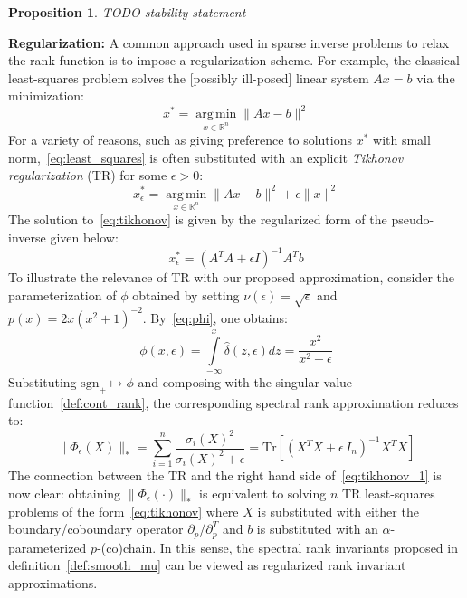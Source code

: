 \documentclass[10pt]{article}
\numberwithin{equation}{section}
\newcommand{\+}{%
	\raisebox{0.18ex}{\scaleobj{0.55}{+}}
}
\DeclareMathOperator*{\argmin}{arg\,min}
\newtheorem{proposition}{Proposition}
\theoremstyle{definition}
\theoremstyle{definition}
\begin{document}
\begin{proposition}
	TODO stability statement
\end{proposition}  
\textbf{Regularization:} A common approach used in sparse inverse problems to relax the rank function is to impose a regularization scheme. 
For example, the classical least-squares problem solves the [possibly ill-posed] linear system $A x = b$ via the minimization:
\begin{equation}\label{eq:least_squares}
	x^\ast = \argmin\limits_{x \in \mathbb{R}^n} \lVert A x - b \rVert^2	
\end{equation}
For a variety of reasons, such as giving preference to solutions $x^\ast$ with small norm,~\eqref{eq:least_squares} is often substituted with an explicit \emph{Tikhonov regularization} (TR) for some $\epsilon > 0$:
\begin{equation}\label{eq:tikhonov}
	x_\epsilon^\ast = \argmin\limits_{x \in \mathbb{R}^n} \lVert Ax - b\rVert^2 + \epsilon \lVert x \rVert^2
\end{equation}
The solution to~\eqref{eq:tikhonov} is given by the regularized form of the pseudo-inverse given below:  
\begin{equation}\label{eq:tikhonov_soln}
	x_\epsilon^\ast = (A^T A + \epsilon I)^{-1} A^T b
\end{equation}
To illustrate the relevance of TR with our proposed approximation, consider the parameterization
 of $\phi$ obtained by setting $\nu(\epsilon) = \sqrt{\epsilon}$ and $p(x) = 2x (x^2 + 1)^{-2}$. By~\eqref{eq:phi}, one obtains:
\begin{equation}
	\phi(x, \epsilon) = \int\limits_{-\infty}^x \hat{\delta}(z, \epsilon) dz = \frac{x^2}{x^2 + \epsilon}
\end{equation}
Substituting $\mathrm{sgn}_+ \mapsto \phi$ and composing with the singular value function~\eqref{def:cont_rank}, the corresponding spectral rank approximation reduces to:
\begin{equation}\label{eq:tikhonov_1}
	\lVert \Phi_\epsilon(X) \rVert_\ast = \sum\limits_{i = 1}^n \frac{\sigma_i(X)^2}{\sigma_i(X)^2 + \epsilon} = \mathrm{Tr}\left[(X^T X + \epsilon \, I_n)^{-1} X^T X \right] 
\end{equation}
The connection between the TR and the right hand side of~\eqref{eq:tikhonov_1} is now clear: obtaining $ \lVert \Phi_\epsilon(\cdot) \rVert_\ast$ is equivalent to solving $n$ TR least-squares problems of the form~\eqref{eq:tikhonov} where $X$ is substituted with either the boundary/coboundary operator $\partial_p$/$\partial_p^T$ and $b$ is substituted with an $\alpha$-parameterized $p$-(co)chain.
In this sense, the spectral rank invariants proposed in definition~\ref{def:smooth_mu} can be viewed as regularized rank invariant approximations.
 
\end{document}
